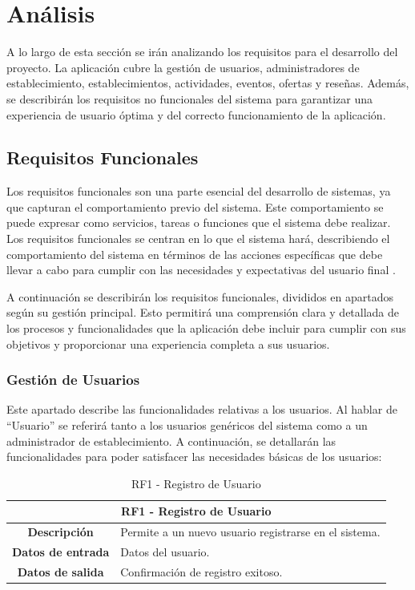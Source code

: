 \chapter{Análisis}



A lo largo de esta sección se irán analizando los requisitos para el desarrollo del proyecto. La aplicación cubre la gestión de usuarios, administradores de establecimiento, establecimientos, actividades, eventos, ofertas y reseñas. Además, se describirán los requisitos no funcionales del sistema para garantizar una experiencia de usuario óptima y del correcto funcionamiento de la aplicación.

\section{Requisitos Funcionales}

Los requisitos funcionales son una parte esencial del desarrollo de sistemas, ya que capturan el comportamiento previo del sistema. Este comportamiento se puede expresar como servicios, tareas o funciones que el sistema debe realizar. Los requisitos funcionales se centran en lo que el sistema hará, describiendo el comportamiento del sistema en
términos de las acciones específicas que debe llevar a  cabo para cumplir con las necesidades y expectativas del usuario final \cite{malan_bredemeyer} \cite{shah} \cite{sagar}.

A continuación se describirán los requisitos funcionales, divididos en apartados según su gestión principal. Esto permitirá una comprensión clara y detallada de los procesos y funcionalidades que la aplicación debe incluir para cumplir con sus objetivos y proporcionar una experiencia completa a sus usuarios.


\subsection{Gestión de Usuarios}

Este apartado describe las funcionalidades relativas a los usuarios. Al hablar de “Usuario” se referirá tanto a los usuarios genéricos del sistema como a un administrador de establecimiento. A continuación, se detallarán las funcionalidades para poder satisfacer las necesidades básicas de los usuarios:

\begin{table}[H]
    \centering
    \begin{tabular}{|c|p{10cm}|}
        \hline
        \multicolumn{2}{|c|}{\textbf{RF1 - Registro de Usuario}}                          \\
        \hline
        \textbf{Descripción}      & Permite a un nuevo usuario registrarse en el sistema. \\
        \hline
        \textbf{Datos de entrada} & Datos del usuario.                                    \\
        \hline
        \textbf{Datos de salida}  & Confirmación de registro exitoso.                     \\
        \hline
    \end{tabular}
    \caption{RF1 - Registro de Usuario}
\end{table}

